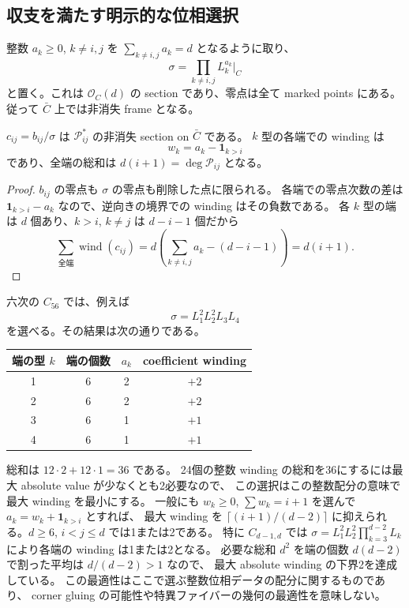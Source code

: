\subsection{収支を満たす明示的な位相選択}

整数 $a_k\ge0$, $k\ne i,j$ を $\sum_{k\ne i,j}a_k=d$ となるように取り、
\begin{equation}\label{sc:monomial-frame}
 \sigma=\prod_{k\ne i,j}L_k^{a_k}\big|_C
\end{equation}
と置く。これは $\mathcal O_C(d)$ の section であり、零点は全て marked points にある。
従って $\bar C$ 上では非消失 frame となる。

\begin{proposition}\label{sc:explicit-phase}
$c_{ij}=b_{ij}/\sigma$ は $\mathcal P_{ij}^*$ の非消失 section on $\bar C$ である。
$k$ 型の各端での winding は
\[
 w_k=a_k-\boldsymbol{1}_{k>i}
\]
であり、全端の総和は $d(i+1)=\deg\mathcal P_{ij}$ となる。
\end{proposition}

\begin{proof}
$b_{ij}$ の零点も $\sigma$ の零点も削除した点に限られる。
各端での零点次数の差は $\boldsymbol{1}_{k>i}-a_k$ なので、逆向きの境界での winding はその負数である。
各 $k$ 型の端は $d$ 個あり、$k>i$, $k\ne j$ は $d-i-1$ 個だから
\[
 \sum_{\text{全端}}\operatorname{wind}(c_{ij})
 =d\left(\sum_{k\ne i,j}a_k-(d-i-1)\right)=d(i+1).
\]
\end{proof}

六次の $C_{56}$ では、例えば
\[
 \sigma=L_1^2L_2^2L_3L_4
\]
を選べる。その結果は次の通りである。
\begin{center}
\begin{tabular}{c|c|c|c}
端の型 $k$ & 端の個数 & $a_k$ & coefficient winding\\\hline
1 & 6 & 2 & $+2$\\
2 & 6 & 2 & $+2$\\
3 & 6 & 1 & $+1$\\
4 & 6 & 1 & $+1$
\end{tabular}
\end{center}
総和は $12\cdot2+12\cdot1=36$ である。
24個の整数 winding の総和を36にするには最大 absolute value が少なくとも2必要なので、
この選択はこの整数配分の意味で最大 winding を最小にする。
一般にも $w_k\ge0$, $\sum w_k=i+1$ を選んで $a_k=w_k+\boldsymbol{1}_{k>i}$ とすれば、
最大 winding を $\lceil(i+1)/(d-2)\rceil$ に抑えられる。$d\ge6$, $i<j\le d$ では1または2である。
特に $C_{d-1,d}$ では
$\sigma=L_1^2L_2^2\prod_{k=3}^{d-2}L_k$ により各端の winding は1または2となる。
必要な総和 $d^2$ を端の個数 $d(d-2)$ で割った平均は $d/(d-2)>1$ なので、
最大 absolute winding の下界2を達成している。
この最適性はここで選ぶ整数位相データの配分に関するものであり、
corner gluing の可能性や特異ファイバーの幾何の最適性を意味しない。

